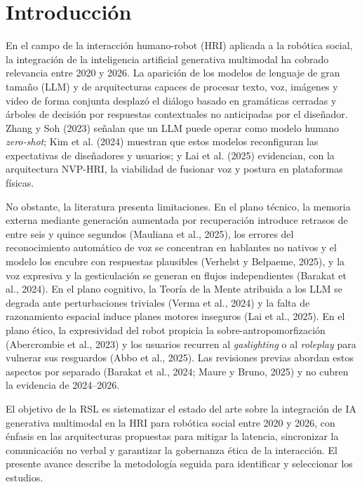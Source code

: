 \documentclass[runningheads]{llncs}
\begin{document}
\section{Introducción}
En el campo de la interacción humano-robot (HRI) aplicada a la robótica social, la integración de la inteligencia artificial generativa multimodal ha cobrado relevancia entre 2020 y 2026. La aparición de los modelos de lenguaje de gran tamaño (LLM) y de arquitecturas capaces de procesar texto, voz, imágenes y video de forma conjunta desplazó el diálogo basado en gramáticas cerradas y árboles de decisión por respuestas contextuales no anticipadas por el diseñador. Zhang y Soh (2023) señalan que un LLM puede operar como modelo humano \textit{zero-shot}; Kim et al. (2024) muestran que estos modelos reconfiguran las expectativas de diseñadores y usuarios; y Lai et al. (2025) evidencian, con la arquitectura NVP-HRI, la viabilidad de fusionar voz y postura en plataformas físicas.

No obstante, la literatura presenta limitaciones. En el plano técnico, la memoria externa mediante generación aumentada por recuperación introduce retrasos de entre seis y quince segundos (Mauliana et al., 2025), los errores del reconocimiento automático de voz se concentran en hablantes no nativos y el modelo los encubre con respuestas plausibles (Verhelst y Belpaeme, 2025), y la voz expresiva y la gesticulación se generan en flujos independientes (Barakat et al., 2024). En el plano cognitivo, la Teoría de la Mente atribuida a los LLM se degrada ante perturbaciones triviales (Verma et al., 2024) y la falta de razonamiento espacial induce planes motores inseguros (Lai et al., 2025). En el plano ético, la expresividad del robot propicia la sobre-antropomorfización (Abercrombie et al., 2023) y los usuarios recurren al \textit{gaslighting} o al \textit{roleplay} para vulnerar sus resguardos (Abbo et al., 2025). Las revisiones previas abordan estos aspectos por separado (Barakat et al., 2024; Maure y Bruno, 2025) y no cubren la evidencia de 2024--2026.

El objetivo de la RSL es sistematizar el estado del arte sobre la integración de IA generativa multimodal en la HRI para robótica social entre 2020 y 2026, con énfasis en las arquitecturas propuestas para mitigar la latencia, sincronizar la comunicación no verbal y garantizar la gobernanza ética de la interacción. El presente avance describe la metodología seguida para identificar y seleccionar los estudios.
\end{document}
